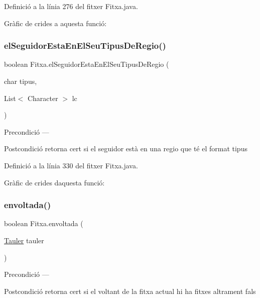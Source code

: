 Definició a la línia 276 del fitxer Fitxa.\+java.

Gràfic de crides a aquesta funció\+:
\mbox{\label{class_fitxa_a346f5ae28e00995b74b1aba8c630e30d}} 
\subsubsection{\texorpdfstring{el\+Seguidor\+Esta\+En\+El\+Seu\+Tipus\+De\+Regio()}{elSeguidorEstaEnElSeuTipusDeRegio()}}
{\footnotesize\ttfamily boolean Fitxa.\+el\+Seguidor\+Esta\+En\+El\+Seu\+Tipus\+De\+Regio (\begin{DoxyParamCaption}\item[{char}]{tipus,  }\item[{List$<$ Character $>$}]{lc }\end{DoxyParamCaption})}

\begin{DoxyPrecond}{Precondició}
--- 
\end{DoxyPrecond}
\begin{DoxyPostcond}{Postcondició}
retorna cert si el seguidor està en una regio que té el format tipus 
\end{DoxyPostcond}


Definició a la línia 330 del fitxer Fitxa.\+java.

Gràfic de crides d\textquotesingle{}aquesta funció\+:
\mbox{\label{class_fitxa_a3470f3a172ff316366ad90579ccb7bef}} 
\subsubsection{\texorpdfstring{envoltada()}{envoltada()}}
{\footnotesize\ttfamily boolean Fitxa.\+envoltada (\begin{DoxyParamCaption}\item[{\mbox{\hyperlink{class_tauler}{Tauler}}}]{tauler }\end{DoxyParamCaption})}

\begin{DoxyPrecond}{Precondició}
--- 
\end{DoxyPrecond}
\begin{DoxyPostcond}{Postcondició}
retorna cert si el voltant de la fitxa actual hi ha fitxes altrament fals 
\end{DoxyPostcond}


